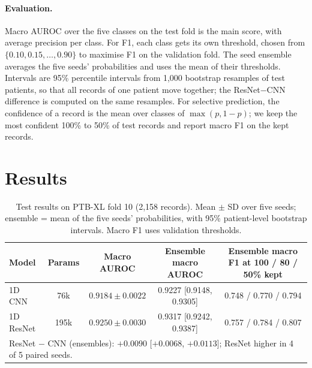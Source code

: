 \documentclass[11pt,a4paper]{article}
\begin{document}
\paragraph{Evaluation.} Macro AUROC over the five classes on the test fold is the main score, with average
precision per class. For F1, each class gets its own threshold, chosen from $\{0.10, 0.15, \dots, 0.90\}$ to maximise
F1 on the validation fold. The seed ensemble averages the five seeds' probabilities and uses the mean of their
thresholds. Intervals are 95\% percentile intervals from 1,000 bootstrap resamples of test patients, so that all
records of one patient move together; the ResNet$-$CNN difference is computed on the same resamples. For selective
prediction, the confidence of a record is the mean over classes of $\max(p, 1-p)$; we keep the most confident
100\% to 50\% of test records and report macro F1 on the kept records.

\section{Results}

\begin{table}[t]
\centering
\caption{Test results on PTB-XL fold 10 (2,158 records). Mean $\pm$ SD over five seeds; ensemble = mean of the five
seeds' probabilities, with 95\% patient-level bootstrap intervals. Macro F1 uses validation thresholds.}
\label{tab:main}
\small
\begin{tabular}{lcccc}
\toprule
Model & Params & Macro AUROC & Ensemble macro AUROC & Ensemble macro F1 at 100 / 80 / 50\% kept \\
\midrule
1D CNN    & 76k  & $0.9184 \pm 0.0022$ & 0.9227 [0.9148, 0.9305] & 0.748 / 0.770 / 0.794 \\
1D ResNet & 195k & $0.9250 \pm 0.0030$ & 0.9317 [0.9242, 0.9387] & 0.757 / 0.784 / 0.807 \\
\midrule
\multicolumn{5}{l}{ResNet $-$ CNN (ensembles): $+0.0090$ [$+0.0068$, $+0.0113$]; ResNet higher in 4 of 5 paired seeds.}\\
\bottomrule
\end{tabular}
\end{table}
\end{document}
